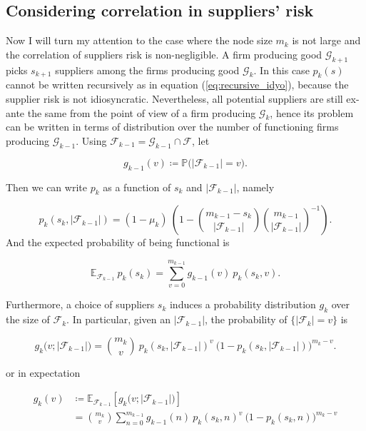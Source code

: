 \documentclass[american, abstract=on]{scrartcl}
\newcommand{\F}{\mathcal{F}}
\newcommand{\G}{\mathcal{G}}
\renewcommand{\P}{\mathbb{P}}
\newcommand{\E}{\mathbb{E}}
\newcommand{\abs}[1]{\left\lvert#1\right\rvert}
\begin{document}
\subsection{Considering correlation in suppliers' risk} \label{sec:vertical:considering}

Now I will turn my attention to the case where the node size $m_k$ is not large and the correlation of suppliers risk is non-negligible. A firm producing good $\G_{k + 1}$ picks $s_{k + 1}$ suppliers among the firms producing good $\G_k$. In this case $p_k(s)$ cannot be written recursively as in equation (\ref{eq:recursive_idyo}), because the supplier risk is not idiosyncratic. Nevertheless, all potential suppliers are still ex-ante the same from the point of view of a firm producing $\G_k$, hence its problem can be written in terms of distribution over the number of functioning firms producing $\G_{k-1}$. Using $\F_{k-1} = \G_{k-1} \cap \F$, let

\begin{equation}
  g_{k-1}(v) \coloneqq \P\Big( \abs{\F_{k-1}} = v \Big).
\end{equation}

Then we can write $p_k$ as a function of $s_k$ and $\abs{\F_{k-1}}$, namely

\begin{equation}
  p_k\left(s_k, \abs{\F_{k-1}} \right) = (1 - \mu_k) \ \left(1 - \binom{m_{k-1} - s_k}{\abs{\F_{k-1}}} \binom{m_{k-1}}{\abs{\F_{k-1}}}^{-1} \right).
\end{equation}
And the expected probability of being functional is

\begin{equation}
  \E_{\F_{k-1}} \  p_k(s_k) = \sum^{m_{k-1}}_{v = 0} g_{k-1}(v) \  p_k(s_k, v).
\end{equation}

Furthermore, a choice of suppliers $s_k$ induces a probability distribution $g_k$ over the size of $\F_k$. In particular, given an $\abs{\F_{k-1}}$, the probability of $\{ \abs{\F_{k}} = v \}$ is 

\begin{equation}
  g_k\Big(v; \abs{\F_{k-1}}\Big) = \binom{m_k}{v} \ p_k(s_k, \abs{\F_{k-1}})^{v} \ \Big(1 - p_k(s_k, \abs{\F_{k-1}})\Big)^{m_k - v}.
\end{equation}

or in expectation

\begin{equation}
  \begin{split}
    g_k(v) &\coloneqq \E_{\F_{k-1}} \left[ g_k\Big(v; \abs{\F_{k-1}}\Big)\right] \\
    &= \binom{m_k}{v} \sum^{m_{k-1}}_{n = 0} g_{k-1}(n) \ p_{k}(s_k, n)^{v} \ \Big(1 - p_{k}(s_k, n)\Big)^{m_k - v}
  \end{split}
\end{equation}
\end{document}
